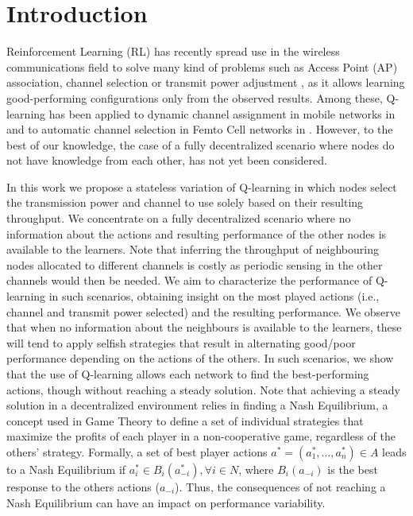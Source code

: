 \documentclass[conference]{IEEEtran}
\begin{document}
	\section{Introduction}
	Reinforcement Learning (RL) has recently spread use in the wireless communications field to solve many kind of problems such as Access Point (AP) association\cite{chen2010ap}, channel selection \cite{maghsudi2015channel} or transmit power adjustment \cite{maghsudi2015joint}, as it allows learning good-performing configurations only from the observed results. Among these, Q-learning has been applied to dynamic channel assignment in mobile networks in \cite{nie1999qlearning} and to automatic channel selection in Femto Cell networks in \cite{bennis2010q}. However, to the best of our knowledge, the case of a fully decentralized scenario where nodes do not have knowledge from each other, has not yet been considered.  
	
	In this work we propose a stateless variation of Q-learning in which nodes select the transmission power and channel to use solely based on their resulting throughput. We concentrate on a fully decentralized scenario where no information about the actions and resulting performance of the other nodes is available to the learners. Note that inferring the throughput of neighbouring nodes allocated to different channels is costly as periodic sensing in the other channels would then be needed. We aim to characterize the performance of Q-learning in such scenarios, obtaining insight on the most played actions (i.e., channel and transmit power selected) and the resulting performance. We observe that when no information about the neighbours is available to the learners, these will tend to apply selfish strategies that result in alternating good/poor performance depending on the actions of the others. In such scenarios, we show that the use of Q-learning allows each network to find the best-performing actions, though without reaching a steady solution. Note that achieving a steady solution in a decentralized environment relies in finding a Nash Equilibrium, a concept used in Game Theory to define a set of individual strategies that maximize the profits of each player in a non-cooperative game, regardless of the others' strategy. Formally, a set of best player actions $a^* = (a_1^*, ..., a_n^*) \in A$ leads to a Nash Equilibrium if $a_i^* \in B_i(a_{-i}^*), \forall i \in N$, where $B_i(a_{-i})$ is the best response to the others actions ($a_{-i}$). Thus, the consequences of not reaching a Nash Equilibrium can have an impact on performance variability.
	
\end{document}
